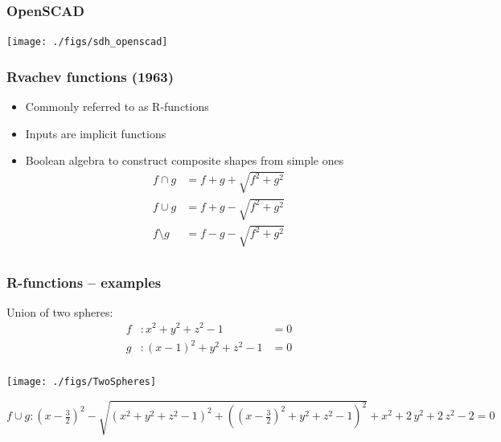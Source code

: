 \documentclass{beamer}
\begin{document}
\begin{frame}
\frametitle{OpenSCAD} 
\centerline{\texttt{[image: ./figs/sdh\_openscad]}} 
\end{frame}

\begin{frame} 
\frametitle{Rvachev functions (1963)} 
\begin{itemize} 
\item Commonly referred to as R-functions 
\item Inputs are implicit functions
\item Boolean algebra to construct composite shapes from simple ones 
\[
    \begin{aligned}
    f \cap g &= f + g + \sqrt{f^2 + g^2}       \\ 
    f \cup g &= f + g - \sqrt{f^2 + g^2}       \\
    f \setminus g &= f - g - \sqrt{f^2 + g^2}  \\
    \end{aligned}
\]
\end{itemize} 
\end{frame}
\begin{frame}[t] 
\frametitle{R-functions -- examples} 
Union of two spheres:
\[
   \begin{aligned}
   f&: x^2+y^2+z^2 - 1 &= 0 \\
   g&: (x-1)^2+y^2+z^2 - 1 &= 0 \\
   \end{aligned}
\]


\begin{center}
{\tiny
\centerline{\texttt{[image: ./figs/TwoSpheres]}} 
\vspace{-3mm}
$
f \cup g: {\left(x-\frac{3}{2}\right)}^2-\sqrt{{\left(x^2+y^2+z^2-1\right)}^2+{\left({\left(x-\frac{3}{2}\right)}^2+y^2+z^2-1\right)}^2}+x^2+2\,y^2+2\,z^2-2 = 0$ 
}
\end{center}
\end{frame} 

\end{document}

